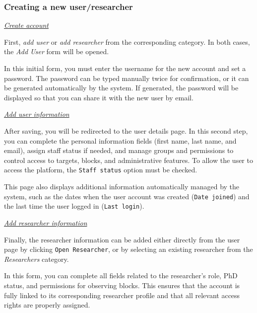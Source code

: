 \subsubsection{Creating a new user/researcher}


\underline{\textsl{Create account}}

First, \textsl{add user} or \textsl{add researcher} from the corresponding category. In both cases, the \textsl{Add User} form will be opened. 

In this initial form, you must enter the username for the new account and set a password. The password can be typed manually twice for confirmation, or it can be generated automatically by the system. If generated, the password will be displayed so that you can share it with the new user by email.


\underline{\textsl{Add user information}}

After saving, you will be redirected to the user details page. In this second step, you can complete the personal information fields (first name, last name, and email), assign staff status if needed, and manage groups and permissions to control access to targets, blocks, and administrative features. To allow the user to access the platform, the \texttt{Staff status} option must be checked.


This page also displays additional information automatically managed by the system, such as the dates when the user account was created (\texttt{Date joined}) and the last time the user logged in (\texttt{Last login}).


\underline{\textsl{Add researcher information}}

Finally, the researcher information can be added either directly from the user page by clicking \texttt{Open Researcher}, or by selecting an existing researcher from the \textsl{Researchers} category. 

In this form, you can complete all fields related to the researcher’s role, PhD status, and permissions for observing blocks. This ensures that the account is fully linked to its corresponding researcher profile and that all relevant access rights are properly assigned. 

